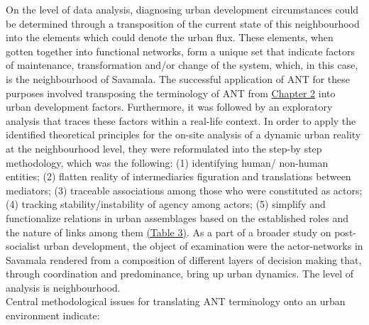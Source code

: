 \documentclass[11pt]{report}
\begin{document}
On the level of data analysis, diagnosing urban development circumstances could be determined through a transposition of the current state of this neighbourhood into the elements which could denote the urban flux. These elements, when gotten together into functional networks, form a unique set that indicate factors of maintenance, transformation and/or change of the system, which, in this case, is the neighbourhood of Savamala. The successful application of ANT for these purposes involved transposing the terminology of ANT from \href{}{Chapter 2} into urban development factors. Furthermore, it was followed by an exploratory analysis that traces these factors within a real-life context. In order to apply the identified theoretical principles for the on-site analysis of a dynamic urban reality at the neighbourhood level, they were reformulated into the step-by step methodology, which was the following: (1) identifying human/ non-human entities; (2) flatten reality of intermediaries figuration and translations between mediators; (3) traceable associations among those who were constituted as actors; (4) tracking stability/instability of agency among actors; (5) simplify and functionalize relations in urban assemblages based on the established roles and the nature of links among them \href{}{(Table 3)}. As a part of a broader study on post-socialist urban development, the object of examination were the actor-networks in Savamala rendered from a composition of different layers of decision making that, through coordination and predominance, bring up urban dynamics. The level of analysis is neighbourhood. 
\\
Central methodological issues for translating ANT terminology onto an urban environment indicate: 
\end{document}
